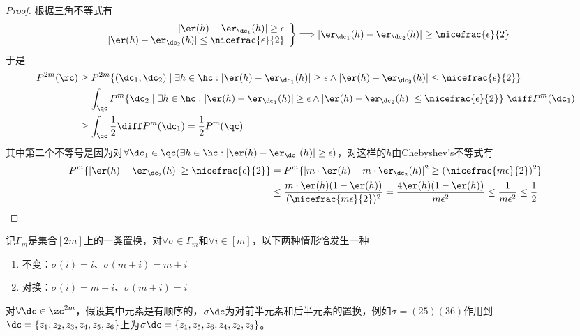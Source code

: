 \documentclass{ctexart}
\begin{document}
\begin{proof}
    根据三角不等式有
    \begin{align*}
        \left. \begin{array}{r}
                   |\er(h) - \er_{\dc_1} (h)| \ge \epsilon \\
                   |\er(h) - \er_{\dc_2} (h)| \le \nicefrac{\epsilon}{2}
               \end{array} \right\} \Longrightarrow |\er_{\dc_1} (h) - \er_{\dc_2} (h)| \ge \nicefrac{\epsilon}{2}
    \end{align*}
    于是
    \begin{align*}
        P^{2m} (\rc) & \ge P^{2m} \{ (\dc_1, \dc_2) \mid \exists h \in \hc: |\er(h) - \er_{\dc_1} (h)| \ge \epsilon \wedge |\er(h) - \er_{\dc_2} (h)| \le \nicefrac{\epsilon}{2} \}                 \\
                       & = \int_\qc P^m \{\dc_2 \mid \exists h \in \hc: |\er(h) - \er_{\dc_1} (h)| \ge \epsilon \wedge |\er(h) - \er_{\dc_2} (h)| \le \nicefrac{\epsilon}{2} \} ~ \diff P^m (\dc_1) \\
                       & \ge \int_\qc \frac{1}{2} \diff P^m (\dc_1) = \frac{1}{2} P^m (\qc)
    \end{align*}
    其中第二个不等号是因为对$\forall \dc_1 \in \qc (\exists h \in \hc: |\er(h) - \er_{\dc_1} (h)| \ge \epsilon)$，对这样的$h$由Chebyshev's不等式有
    \begin{align*}
        P^m \{ |\er(h) - \er_{\dc_2} (h)| \ge \nicefrac{\epsilon}{2} \}
         & = P^m \{ |m \cdot \er(h) - m \cdot \er_{\dc_2} (h)|^2 \ge (\nicefrac{m \epsilon}{2})^2\}                                                                   \\
         & \le \frac{m \cdot \er(h) (1 - \er(h))}{(\nicefrac{m \epsilon}{2})^2} = \frac{4 \er(h) (1 - \er(h))}{m \epsilon^2} \le \frac{1}{m \epsilon^2} \le \frac{1}{2}
    \end{align*}
\end{proof}

记$\Gamma_m$是集合$[2m]$上的一类置换，对$\forall \sigma \in \Gamma_m$和$\forall i \in [m]$，以下两种情形恰发生一种
\begin{enumerate}
    \item 不变：$\sigma(i) = i$、$\sigma(m+i) = m+i$
    \item 对换：$\sigma(i) = m+i$、$\sigma(m+i) = i$
\end{enumerate}
对$\forall \dc \in \zc^{2m}$，假设其中元素是有顺序的，$\sigma \dc$为对前半元素和后半元素的置换，例如$\sigma = (25)(36)$作用到$\dc= \{ z_1, z_2, z_3, z_4, z_5, z_6 \}$上为$\sigma \dc = \{ z_1, z_5, z_6, z_4, z_2, z_3 \}$。
\end{document}
